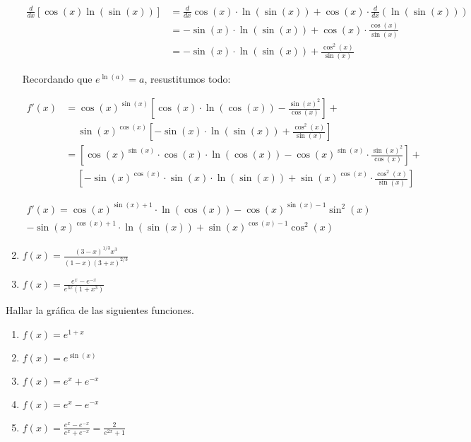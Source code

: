 \documentclass[12pt]{article}
\begin{document}
\begin{enumerate}[\hspace{9px} a)]
        \begin{align*}
            \frac{d}{dx}[\cos(x)\ln(\sin(x))] &= \frac{d}{dx}\cos(x)\cdot\ln(\sin(x)) + \cos(x)\cdot\frac{d}{dx}(\ln(\sin(x)))\\
            &= -\sin(x)\cdot\ln(\sin(x))+\cos(x)\cdot\frac{\cos(x)}{\sin(x)}\\
            &= -\sin(x)\cdot\ln(\sin(x))+\frac{\cos^2(x)}{\sin(x)}
        \end{align*}

        Recordando que \(e^{\ln(a)}=a\), resustitumos todo:

        \begin{align*}
            f'(x) &= \cos(x)^{\sin(x)}\left[\cos(x)\cdot\ln(\cos(x)) - \frac{\sin(x)^2}{\cos(x)}\right]+\\
            & \quad  \ \sin(x)^{\cos(x)}\left[-\sin(x)\cdot\ln(\sin(x))+\frac{\cos^2(x)}{\sin(x)}\right]\\
            &= \left[\cos(x)^{\sin(x)}\cdot\cos(x)\cdot\ln(\cos(x)) - \cos(x)^{\sin(x)}\cdot\frac{\sin(x)^2}{\cos(x)}\right]+\\
            & \quad \ \left[-\sin(x)^{\cos(x)}\cdot\sin(x)\cdot\ln(\sin(x)) + \sin(x)^{\cos(x)}\cdot\frac{\cos^2(x)}{\sin(x)}\right]
        \end{align*}

        \begin{multline*}
            f'(x) = \cos(x)^{\sin(x)+1}\cdot\ln(\cos(x)) - \cos(x)^{\sin(x)-1}\sin^2(x) \\- \sin(x)^{\cos(x)+1}\cdot\ln(\sin(x)) + \sin(x)^{\cos(x)-1}\cos^2(x)
        \end{multline*}

    \item \(f(x)=\displaystyle\frac{(3-x)^{1/3}x^3}{(1-x)(3+x)^{2/3}}\)

    \item \(f(x)=\displaystyle\frac{e^x-e^{-x}}{e^{3x}(1+x^3)}\)

\end{enumerate}

Hallar la gr\'afica de las siguientes funciones.

\begin{enumerate}[\hspace{9px} a)]
    \item \(f(x)=e^{1+x}\)

    \item \(f(x)=e^{\sin(x)}\)

    \item \(f(x)=e^x+e^{-x}\)

    \item \(f(x)=e^x-e^{-x}\)

    \item \(f(x)=\displaystyle\frac{e^x-e^{-x}}{e^x+e^{-x}}=\frac{2}{e^{2x}+1}\)

\end{enumerate}
\end{document}
